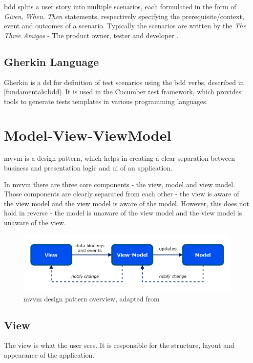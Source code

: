\gls{bdd} splits a user story into multiple scenarios, each formulated in the form of \textit{Given}, \textit{When}, \textit{Then} statements, respectively specifying the prerequisite/context, event and outcomes of a scenario. 
\label{amigos}
Typically the scenarios are written by the \textit{The Three Amigos} - The product owner, tester and developer \parencite{cucumber_amigos}.

\subsection{Gherkin Language}

Gherkin \parencite{gherkin_language} is a \gls{dsl} for definition of test scenarios using the \gls{bdd} verbs, described in \ref{fundamentals:bdd}. It is used in the Cucumber test framework, which provides tools to generate tests templates in various programming languages.

\section{Model-View-ViewModel}
\label{sec:mvvm}
\gls{mvvm} is a design pattern, which helps in creating a clear separation between business and presentation logic and \gls{ui} of an application. \parencite[7-9]{microsoft_mvvm}

In \gls{mvvm} there are three core components - the view, model and view model. Those components are clearly separated from each other - the view is aware of the view model and the view model is aware of the model. However, this does not hold in reverse - the model is unaware of the view model and the view model is unaware of the view. 

\begin{figure}[H]
  \includegraphics[width=\textwidth]{images/mvvm.png}
   \caption{\gls{mvvm} design pattern overview, adapted from \parencite[7]{microsoft_mvvm}}
   \label{fig:mvvm}
 \end{figure}

\subsection{View}
The view is what the user sees. It is responsible for the structure, layout and appearance of the application.

